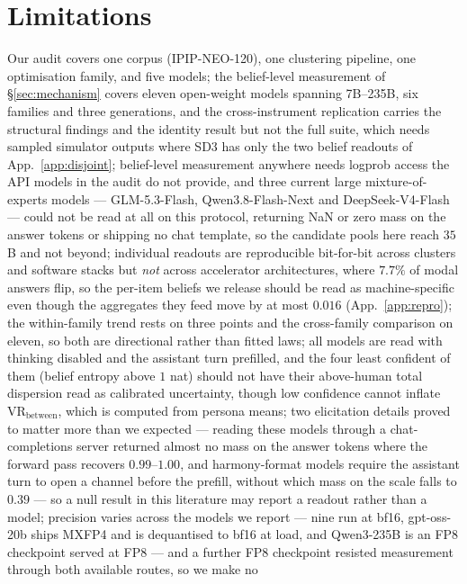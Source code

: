 \documentclass[11pt]{article}
\begin{document}
\section*{Limitations}

Our audit covers one corpus (IPIP-NEO-120), one clustering pipeline, one
optimisation family, and five models; the belief-level measurement of
\S\ref{sec:mechanism} covers eleven open-weight models spanning 7B--235B,
six families and three generations, and the cross-instrument replication
carries the structural findings and the identity
result but not the full suite, which needs sampled
simulator outputs where SD3 has only the two belief readouts of
App.~\ref{app:disjoint}; belief-level measurement anywhere needs logprob access
the API models in the audit do not provide, and three current large
mixture-of-experts models --- GLM-5.3-Flash, Qwen3.8-Flash-Next and
DeepSeek-V4-Flash --- could not be read at all on this protocol, returning NaN
or zero mass on the answer tokens or shipping no chat template, so the
candidate pools here reach $35$B and not beyond; individual readouts are
reproducible bit-for-bit across clusters and software stacks but \emph{not}
across accelerator architectures, where $7.7\%$ of modal answers flip, so the
per-item beliefs we release should be read as machine-specific even though the
aggregates they feed move by at most $0.016$ (App.~\ref{app:repro}); the within-family trend rests on three
points and the cross-family comparison on eleven, so both are directional rather
than fitted laws; all models are read with thinking disabled and the assistant
turn prefilled, and the four least confident of them (belief entropy above $1$
nat) should not have their above-human total dispersion read as calibrated
uncertainty, though low confidence cannot inflate
$\mathrm{VR}_\text{between}$, which is computed from persona means; two
elicitation details proved to matter more than we expected --- reading these
models through a chat-completions server returned almost no mass on the answer
tokens where the forward pass recovers $0.99$--$1.00$, and harmony-format models
require the assistant turn to open a channel before the prefill, without which
mass on the scale falls to $0.39$ --- so a null result in this literature may
report a readout rather than a model; precision varies across the models we
report --- nine run at bf16, gpt-oss-20b ships MXFP4 and is dequantised to bf16 at
load, and Qwen3-235B is an FP8 checkpoint served at FP8 --- and a further FP8
checkpoint resisted measurement through both available routes, so we make no
\end{document}
